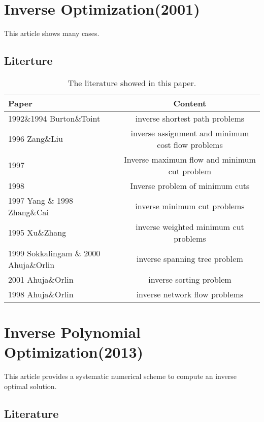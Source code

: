 \documentclass[UTF8]{article}
\begin{document}
\section{Inverse Optimization(2001)}

This article shows many cases.

\subsection{Literture}


\begin{table}[ht]

\tabcolsep=70pt

\small\renewcommand{}

\caption{The literature showed in this paper.\label{tab:1}}

{\begin{tabular}{lc}
\hline
Paper & Content \\
\hline
1992\&1994 Burton\&Toint & inverse shortest path problems \\
\hline
1996 Zang\&Liu &  inverse assignment and minimum cost flow problems \\
\hline
1997  &  Inverse maximum flow and minimum cut problem \\
\hline
1998  &  Inverse problem of minimum cuts \\
\hline
1997 Yang \& 1998 Zhang\&Cai & inverse minimum cut problems \\
\hline
1995 Xu\&Zhang & inverse weighted minimum cut problems \\
\hline
1999 Sokkalingam \& 2000 Ahuja\&Orlin & inverse spanning tree problem \\
\hline
2001 Ahuja\&Orlin & inverse sorting problem \\
\hline
1998 Ahuja\&Orlin & inverse network flow problems \\
\hline
\end{tabular}}
{}
\end{table}


\section{Inverse Polynomial Optimization(2013)}


This article provides a systematic numerical scheme to compute an inverse optimal solution.

\subsection{Literature}
\end{document}
